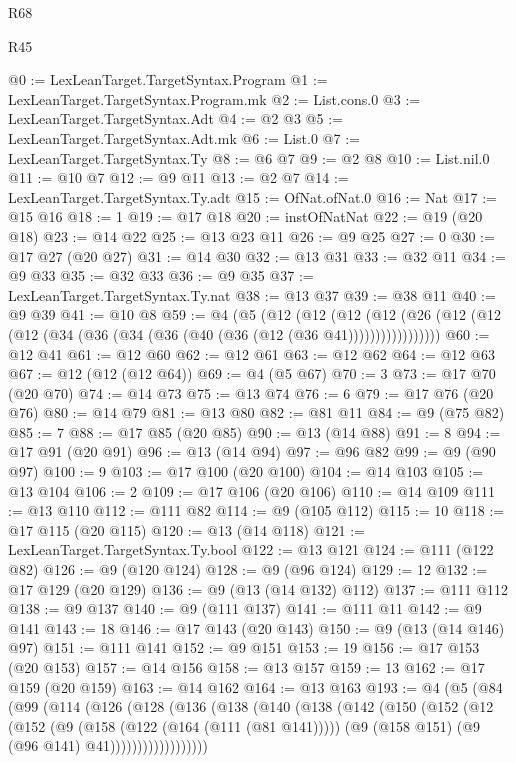 \begin{lexlean}{R68}
\begin{lexlean}{R45}
\begin{coremodule}
{{{{{{{{{{{{{{{{{{{{{{{{{{{{{{{{{{{{{{{{{{{{{{{{{{{{{{{{{{{{{{{{{{{{{{{{{{{{{{{{{{{{{{{{{{{@0 := LexLeanTarget.TargetSyntax.Program
@1 := LexLeanTarget.TargetSyntax.Program.mk
@2 := List.cons.{0}
@3 := LexLeanTarget.TargetSyntax.Adt
@4 := @2 @3
@5 := LexLeanTarget.TargetSyntax.Adt.mk
@6 := List.{0}
@7 := LexLeanTarget.TargetSyntax.Ty
@8 := @6 @7
@9 := @2 @8
@10 := List.nil.{0}
@11 := @10 @7
@12 := @9 @11
@13 := @2 @7
@14 := LexLeanTarget.TargetSyntax.Ty.adt
@15 := OfNat.ofNat.{0}
@16 := Nat
@17 := @15 @16
@18 := 1
@19 := @17 @18
@20 := instOfNatNat
@22 := @19 (@20 @18)
@23 := @14 @22
@25 := @13 @23 @11
@26 := @9 @25
@27 := 0
@30 := @17 @27 (@20 @27)
@31 := @14 @30
@32 := @13 @31
@33 := @32 @11
@34 := @9 @33
@35 := @32 @33
@36 := @9 @35
@37 := LexLeanTarget.TargetSyntax.Ty.nat
@38 := @13 @37
@39 := @38 @11
@40 := @9 @39
@41 := @10 @8
@59 := @4
    (@5
      (@12
        (@12
          (@12 (@12 (@26 (@12 (@12 (@12 (@34 (@36 (@34 (@36 (@40 (@36 (@12 (@36 @41)))))))))))))))))
@60 := @12 @41
@61 := @12 @60
@62 := @12 @61
@63 := @12 @62
@64 := @12 @63
@67 := @12 (@12 (@12 @64))
@69 := @4 (@5 @67)
@70 := 3
@73 := @17 @70 (@20 @70)
@74 := @14 @73
@75 := @13 @74
@76 := 6
@79 := @17 @76 (@20 @76)
@80 := @14 @79
@81 := @13 @80
@82 := @81 @11
@84 := @9 (@75 @82)
@85 := 7
@88 := @17 @85 (@20 @85)
@90 := @13 (@14 @88)
@91 := 8
@94 := @17 @91 (@20 @91)
@96 := @13 (@14 @94)
@97 := @96 @82
@99 := @9 (@90 @97)
@100 := 9
@103 := @17 @100 (@20 @100)
@104 := @14 @103
@105 := @13 @104
@106 := 2
@109 := @17 @106 (@20 @106)
@110 := @14 @109
@111 := @13 @110
@112 := @111 @82
@114 := @9 (@105 @112)
@115 := 10
@118 := @17 @115 (@20 @115)
@120 := @13 (@14 @118)
@121 := LexLeanTarget.TargetSyntax.Ty.bool
@122 := @13 @121
@124 := @111 (@122 @82)
@126 := @9 (@120 @124)
@128 := @9 (@96 @124)
@129 := 12
@132 := @17 @129 (@20 @129)
@136 := @9 (@13 (@14 @132) @112)
@137 := @111 @112
@138 := @9 @137
@140 := @9 (@111 @137)
@141 := @111 @11
@142 := @9 @141
@143 := 18
@146 := @17 @143 (@20 @143)
@150 := @9 (@13 (@14 @146) @97)
@151 := @111 @141
@152 := @9 @151
@153 := 19
@156 := @17 @153 (@20 @153)
@157 := @14 @156
@158 := @13 @157
@159 := 13
@162 := @17 @159 (@20 @159)
@163 := @14 @162
@164 := @13 @163
@193 := @4
    (@5
      (@84
        (@99
          (@114
            (@126
              (@128
                (@136
                  (@138
                    (@140
                      (@138
                        (@142
                          (@150
                            (@152
                              (@12
                                (@152
                                  (@9
                                    (@158 (@122 (@164 (@111 (@81 @141)))))
                                    (@9 (@158 @151) (@9 (@96 @141) @41))))))))))))))))))
}}}}}}}}}}}}}}}}}}}}}}}}}}}}}}}}}}}}}}}}}}}}}}}}}}}}}}}}}}}}}}}}}}}}}}}}}}}}}}}}}}}}}}}}}}}
\end{coremodule}
\end{lexlean}
\end{lexlean}
